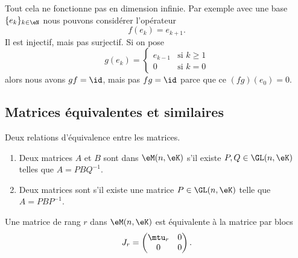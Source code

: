 \begin{example}
    Tout cela ne fonctionne pas en dimension infinie. Par exemple avec une base \( \{ e_k \}_{k\in \eN}\) nous pouvons considérer l'opérateur
    \begin{equation}
        f(e_k)=e_{k+1}.
    \end{equation}
    Il est injectif, mais pas surjectif. Si on pose
    \begin{equation}
        g(e_k)=\begin{cases}
            e_{k-1}    &   \text{si } k\geq 1\\
            0    &    \text{si } k=0
        \end{cases}
    \end{equation}
    alors nous avons \( gf=\id\), mais pas \( fg=\id\) parce que ce \( (fg)(e_0)=0\).
\end{example}

\subsection{Matrices équivalentes et similaires}

\begin{definition}  \label{DefBLELooTvlHoB}
    Deux relations d'équivalence entre les matrices.
    \begin{enumerate}
        \item   \label{ItemPFXCooOUbSCt}
    Deux matrices \( A\) et \( B\) sont  dans \( \eM(n,\eK)\) s'il existe \( P,Q\in\GL(n,\eK)\) telles que \( A=PBQ^{-1}\). 
\item
    Deux matrices sont  s'il existe une matrice \( P\in \GL(n,\eK)\) telle que \( A=PBP^{-1}\).
    \end{enumerate}
\end{definition}

\begin{lemma}   \label{LemZMxxnfM}
    Une matrice de rang \( r\) dans \( \eM(n,\eK)\) est équivalente à la matrice par blocs
    \begin{equation}
        J_r=\begin{pmatrix}
            \mtu_r    &   0    \\ 
            0    &   0    
        \end{pmatrix}.
    \end{equation}
\end{lemma}

